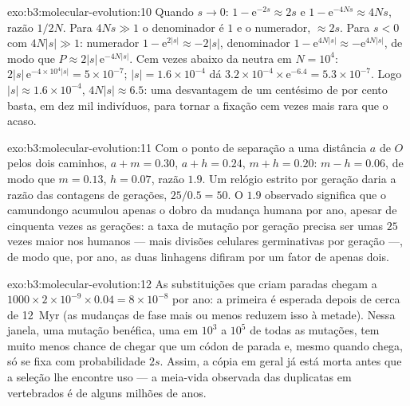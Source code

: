 \begin{solution}{exo:b3:molecular-evolution:10}
Quando $s \to 0$: $1 - \mathrm{e}^{-2s} \approx 2s$ e $1 - \mathrm{e}^{-4Ns}
\approx 4Ns$, razão $1/2N$. Para $4Ns \gg 1$ o
denominador é $1$ e o numerador, $\approx 2s$. Para $s < 0$ com $4N|s| \gg 1$: numerador $1 -
\mathrm{e}^{2|s|} \approx -2|s|$, denominador $1 - \mathrm{e}^{4N|s|} \approx
-\mathrm{e}^{4N|s|}$, de modo que $P \approx 2|s|\,\mathrm{e}^{-4N|s|}$. Cem vezes abaixo da neutra em $N = 10^{4}$:
$2|s|\,\mathrm{e}^{-4\times 10^{4}|s|} =
5\times 10^{-7}$; $|s| = 1.6\times 10^{-4}$ dá $3.2\times 10^{-4}\times
\mathrm{e}^{-6.4} = 5.3\times 10^{-7}$. Logo $|s| \approx 1.6\times 10^{-4}$, $4N|s| \approx 6.5$: uma desvantagem de um centésimo de por cento basta, em dez mil
indivíduos, para tornar a fixação cem vezes mais rara que o acaso.
\end{solution}

\begin{solution}{exo:b3:molecular-evolution:11}
Com o ponto de separação a uma distância $a$ de $O$ pelos dois caminhos,
$a + m =
0.30$, $a + h = 0.24$, $m + h = 0.20$: $m - h = 0.06$, de modo
que $m = 0.13$, $h
= 0.07$, razão $1.9$. Um relógio estrito por geração
daria a razão das contagens de gerações, $25/0.5 = 50$. O $1.9$ observado
significa que o camundongo acumulou apenas o dobro da mudança humana por
ano, apesar de cinquenta vezes as gerações: a taxa de mutação por geração
precisa ser umas $25$ vezes maior nos humanos --- mais divisões celulares
germinativas por geração ---, de modo que, por ano, as duas linhagens
difiram por um fator de apenas dois.
\end{solution}

\begin{solution}{exo:b3:molecular-evolution:12}
As substituições que criam paradas chegam a $1000\times 2\times 10^{-9}\times
0.04 = 8\times 10^{-8}$ por ano: a primeira é esperada
depois de cerca de \qty{12}{Myr} (as mudanças de fase mais ou menos
reduzem isso à metade). Nessa janela, uma mutação benéfica, uma em
$10^{3}$ a $10^{5}$ de todas as mutações, tem muito menos chance de
chegar que um códon de parada e, mesmo quando chega, só se fixa com
probabilidade $2s$. Assim, a cópia em geral já está morta antes que a
seleção lhe encontre uso --- a meia-vida observada das duplicatas em
vertebrados é de alguns milhões de anos.
\end{solution}

